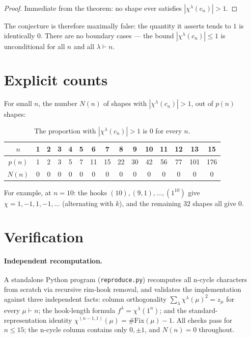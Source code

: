 \documentclass[11pt]{article}
\newcommand{\lc}{c_n}
\newcommand{\chl}{\chi^\lambda}
\begin{document}
\begin{proof}
Immediate from the theorem: no shape ever satisfies $|\chl(\lc)| > 1$.
\end{proof}

The conjecture is therefore maximally false: the quantity it asserts tends to
$1$ is identically $0$. There are no boundary cases --- the bound
$|\chl(\lc)| \le 1$ is unconditional for all $n$ and all $\lambda \vdash n$.

\section{Explicit counts}

For small $n$, the number $N(n)$ of shapes with $|\chl(\lc)|>1$, out of
$p(n)$ shapes:

\begin{table}[h]
\centering
\begin{tabular}{ccccccccccccccc}
\toprule
$n$ & 1 & 2 & 3 & 4 & 5 & 6 & 7 & 8 & 9 & 10 & 11 & 12 & 13 & 15\\
\midrule
$p(n)$ & 1 & 2 & 3 & 5 & 7 & 11 & 15 & 22 & 30 & 42 & 56 & 77 & 101 & 176\\
$N(n)$ & 0 & 0 & 0 & 0 & 0 & 0 & 0 & 0 & 0 & 0 & 0 & 0 & 0 & 0\\
\bottomrule
\end{tabular}
\caption{The proportion with $|\chl(\lc)|>1$ is $0$ for every $n$.}
\end{table}

For example, at $n = 10$: the hooks $(10), (9,1), \dots, (1^{10})$ give
$\chi = 1, -1, 1, -1, \dots$ (alternating with $k$), and the remaining $32$
shapes all give $0$.

\section{Verification}

\paragraph{Independent recomputation.} A standalone Python program
(\texttt{reproduce.py}) recomputes all n-cycle characters from scratch via
recursive rim-hook removal, and validates the implementation against three
independent facts: column orthogonality
$\sum_\lambda \chl(\mu)^2 = z_\mu$ for every $\mu \vdash n$; the
hook-length formula $f^\lambda = \chl(1^n)$; and the standard-representation
identity $\chi^{(n-1,1)}(\mu) = \#\mathrm{Fix}(\mu) - 1$. All checks pass for
$n \le 15$; the n-cycle column contains only $0, \pm 1$, and $N(n) = 0$
throughout.
\end{document}
